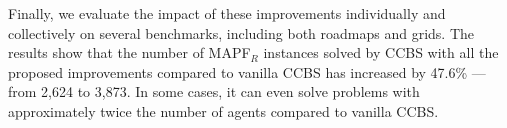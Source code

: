 \documentclass[letterpaper]{article} %
\newcommand\roni[1]{\nb{\textbf{Roni:}}{orange}{#1}}
\newcommand{\ccbs}{\ac{CCBS}\xspace}
\newcommand{\mapfr}{{MAPF}$_R$\xspace}
\newcommand{\mapf}{\ac{MAPF}\xspace}
\newcommand{\ds}{\ac{DS}\xspace}
\begin{document}
Finally, we evaluate the impact of these improvements individually and collectively on several benchmarks, including both roadmaps and grids. 
The results show that the number of \mapfr instances solved by \ccbs with all the proposed improvements compared to vanilla CCBS
has increased by 47.6\% --- from 2,624 to 3,873. 
In some cases, it can even solve problems with approximately twice the number of agents compared to vanilla CCBS. 








\end{document}
